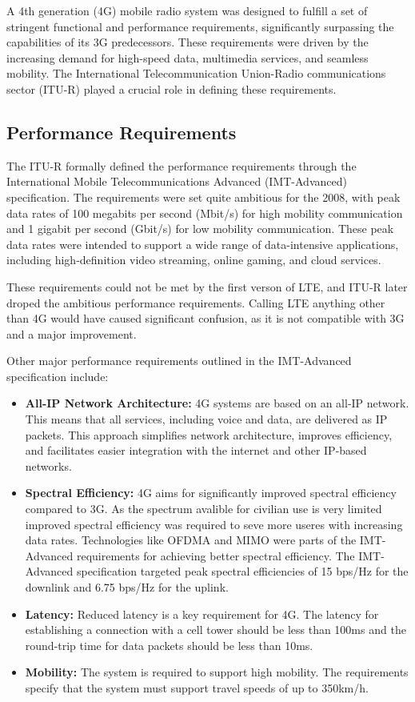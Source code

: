 A 4th generation (4G) mobile radio system was designed to fulfill a set of stringent functional and performance requirements, significantly surpassing the capabilities of its 3G predecessors. These requirements were driven by the increasing demand for high-speed data, multimedia services, and seamless mobility. The International Telecommunication Union-Radio communications sector (ITU-R) played a crucial role in defining these requirements.

\subsection{Performance Requirements}

The ITU-R formally defined the performance requirements through the International Mobile Telecommunications Advanced (IMT-Advanced) specification. The requirements were set quite ambitious for the 2008, with peak data rates of 100 megabits per second (Mbit/s) for high mobility communication and 1 gigabit per second (Gbit/s) for low mobility communication. These peak data rates were intended to support a wide range of data-intensive applications, including high-definition video streaming, online gaming, and cloud services.

These requirements could not be met by the first verson of LTE, and ITU-R later droped the ambitious performance requirements. Calling LTE anything other than 4G would have caused significant confusion, as it is not compatible with 3G and a major improvement.

Other major performance requirements outlined in the IMT-Advanced specification include:

\begin{itemize}
    \item \textbf{All-IP Network Architecture:} 4G systems are based on an all-IP network. This means that all services, including voice and data, are delivered as IP packets. This approach simplifies network architecture, improves efficiency, and facilitates easier integration with the internet and other IP-based networks.
    \item \textbf{Spectral Efficiency:} 4G aims for significantly improved spectral efficiency compared to 3G. As the spectrum avalible for civilian use is very limited improved spectral efficiency was required to seve more useres with increasing data rates. Technologies like OFDMA and MIMO were parts of the IMT-Advanced requirements for achieving better spectral efficiency. The IMT-Advanced specification targeted peak spectral efficiencies of 15 bps/Hz for the downlink and 6.75 bps/Hz for the uplink.
    \item \textbf{Latency:} Reduced latency is a key requirement for 4G. The latency for establishing a connection with a cell tower should be less than 100ms and the round-trip time for data packets should be less than 10ms.
    \item \textbf{Mobility:} The system is required to support high mobility. The requirements specify that the system must support travel speeds of up to 350km/h.
\end{itemize}

